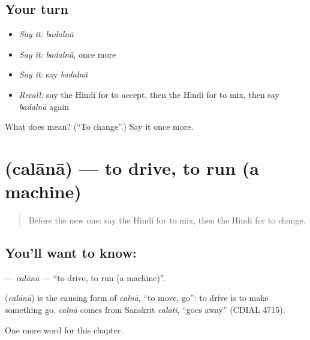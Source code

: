 \subsection*{Your turn}
\begin{itemize}
\raggedright
  \item \emph{Say it:} \emph{badalnā}
  \item \emph{Say it:} \emph{badalnā}, once more
  \item \emph{Say it:} say \emph{badalnā}
  \item \emph{Recall:} say the Hindi for to accept, then the Hindi for to mix, then say \emph{badalnā} again
\end{itemize}

\begin{tcolorbox}[breakable,colback=teal!4,colframe=teal!35!black,title={Before you move on}]
What does  mean? (\textquotedblleft{}To change\textquotedblright{}.) Say it once more.
\end{tcolorbox}
\section[\texorpdfstring{\hi{चलाना} (calānā)}{चलाना (calānā)}]{ (calānā) — to drive, to run (a machine)}

\label{lesson:HI-C168-calana}



\begin{quote}
Before the new one: say the Hindi for to mix, then the Hindi for to change.
\end{quote}

\subsection*{You'll want to know: }
\textbf{} — \emph{calānā} — \textquotedblleft{}to drive, to run (a machine)\textquotedblright{}.

\begin{cousinweb}
\textbf{} (\emph{calānā}) is the causing form of \emph{calnā}, \textquotedblleft{}to move, go\textquotedblright{}: to drive is to make something go. \emph{calnā} comes from Sanskrit \emph{calati}, \textquotedblleft{}goes away\textquotedblright{} (CDIAL 4715).
\end{cousinweb}

\begin{grammarlens}[title={What you've built}]
One more word for this chapter.
\end{grammarlens}

